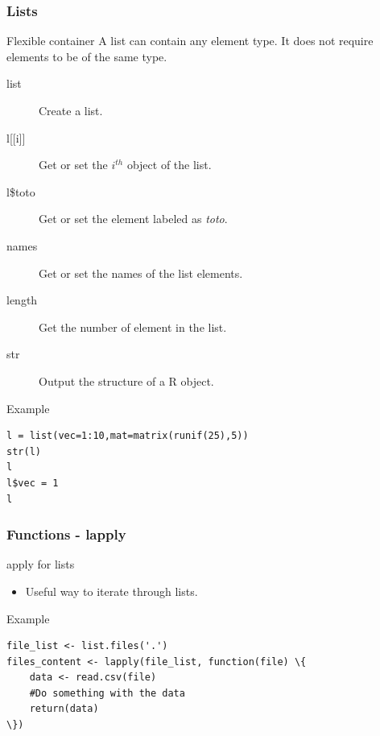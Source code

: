 \documentclass[10pt]{beamer}
\newenvironment{xframe}[2][]
  {\begin{frame}[fragile,environment=xframe,#1]
  \frametitle{#2}}
  {\end{frame}}
\begin{document}

\begin{xframe}{Lists}
  \begin{block}{Flexible container}
    A {\sf list} can contain any element type. It does not require elements to be of
    the same type.
    \begin{description}
      \item[list] Create a {\sf list}.
      \item[{l[[i]]} ] Get or set the $i^{th}$ object of the {\sf list}.
      \item[l\$toto] Get or set the element labeled as {\it toto}.
      \item[names] Get or set the names of the {\sf list} elements.
      \item[length] Get the number of element in the {\sf list}.
      \item[str] Output the structure of a R object.
    \end{description}
  \end{block}
  \begin{exampleblock}{Example}
\begin{verbatim}
l = list(vec=1:10,mat=matrix(runif(25),5))
str(l)
l
l$vec = 1
l
\end{verbatim}
  \end{exampleblock}
\end{xframe}


\begin{xframe}{Functions - {\sf lapply}}
  \begin{block}{apply for {\sf list}s}
    \begin{itemize}
    \item Useful way to iterate through {\sf list}s.
    \end{itemize}
  \end{block}
  \begin{exampleblock}{Example}
\begin{verbatim}
file_list <- list.files('.')
files_content <- lapply(file_list, function(file) \{
	data <- read.csv(file)
	#Do something with the data
	return(data)
\})
\end{verbatim}  
  \end{exampleblock}
\end{xframe}

\end{document}
